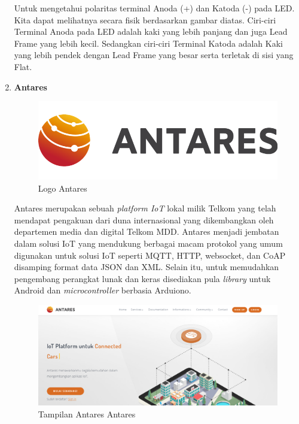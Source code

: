 \begin{enumerate}
\par Untuk mengetahui polaritas terminal Anoda (+) dan Katoda (-) pada LED. Kita dapat melihatnya secara fisik berdasarkan gambar diatas. Ciri-ciri Terminal Anoda pada LED adalah kaki yang lebih panjang dan juga Lead Frame yang lebih kecil. Sedangkan ciri-ciri Terminal Katoda adalah Kaki yang lebih pendek dengan Lead Frame yang besar serta terletak di sisi yang Flat.


\item \textbf{Antares}
\begin{figure}[H]
\centering
\includegraphics[width=1\textwidth]{figures/antares.png}
\caption{Logo Antares}
\label{print}
\end{figure}

\par Antares merupakan sebuah \textit{platform IoT} lokal milik Telkom yang telah mendapat pengakuan dari duna internasional yang dikembangkan oleh departemen media dan digital Telkom MDD. Antares menjadi jembatan dalam solusi IoT yang mendukung berbagai macam protokol yang umum digunakan untuk solusi IoT seperti MQTT, HTTP, websocket, dan CoAP disamping format data JSON dan XML. Selain itu, untuk memudahkan pengembang perangkat lunak dan keras disediakan pula \textit{library} untuk Android dan \textit{microcontroller} berbasia Arduiono.
\begin{figure}[H]
\centering
\includegraphics[width=1.1\textwidth]{figures/antares2.png}
\caption{Tampilan Antares Antares}
\label{print}
\end{figure}




\end{enumerate}
